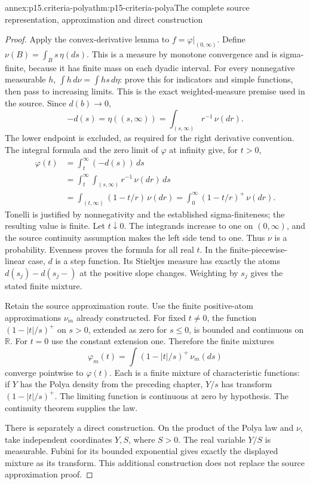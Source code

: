 \begin{annexitem}{annex:p15.criteria-polya}{thm:p15-criteria-polya}{The complete source representation, approximation and direct construction}
\begin{proof}
Apply the convex-derivative lemma to \(f=\varphi|_{(0,\infty)}\).
Define \(\nu(B)=\int_B s\,\eta(ds)\).
This is a measure by monotone convergence and is sigma-finite,
because it has finite mass on each dyadic interval.
For every nonnegative measurable \(h\),
\(\int h\,d\nu=\int hs\,d\eta\): prove this for indicators
and simple functions, then pass to increasing limits.
This is the exact weighted-measure premise used in the source.
Since \(d(b)\to0\),
\[
 -d(s)=\eta((s,\infty))
                =\int_{(s,\infty)}r^{-1}\,\nu(dr).
\]
The lower endpoint is excluded, as required for the right
derivative convention.
The integral formula and the zero limit of \(\varphi\) at
infinity give, for \(t>0\),
\[
 \begin{aligned}
 \varphi(t)
 &=\int_t^\infty(-d(s))\,ds\\
 &=\int_t^\infty\int_{(s,\infty)}r^{-1}\,\nu(dr)\,ds\\
 &=\int_{(t,\infty)}(1-t/r)\,\nu(dr)
  =\int_0^\infty(1-t/r)^+\,\nu(dr).
 \end{aligned}
\]
Tonelli is justified by nonnegativity and the established
sigma-finiteness; the resulting value is finite.
Let \(t\downarrow0\). The integrands increase to one
on \((0,\infty)\), and the source continuity assumption
makes the left side tend to one. Thus \(\nu\) is a
probability. Evenness proves the formula for all real \(t\).
In the finite-piecewise-linear case, \(d\) is a step
function. Its Stieltjes measure has exactly the atoms
\(d(s_j)-d(s_j-)\) at the positive slope changes.
Weighting by \(s_j\) gives the stated finite mixture.

Retain the source approximation route.
Use the finite positive-atom approximations \(\nu_m\)
already constructed. For fixed \(t\ne0\), the function
\((1-|t|/s)^+\) on \(s>0\), extended as zero for \(s\leq0\),
is bounded and continuous on \(\mathbb R\).
For \(t=0\) use the constant extension one.
Therefore the finite mixtures
\[
 \varphi_m(t)=\int(1-|t|/s)^+\,\nu_m(ds)
\]
converge pointwise to \(\varphi(t)\).
Each is a finite mixture of characteristic functions:
if \(Y\) has the Polya density from the preceding
chapter, \(Y/s\) has transform \((1-|t|/s)^+\).
The limiting function is continuous at zero by
hypothesis. The continuity theorem supplies the law.

There is separately a direct construction.
On the product of the Polya law and \(\nu\), take
independent coordinates \(Y,S\), where \(S>0\).
The real variable \(Y/S\) is measurable.
Fubini for its bounded exponential gives exactly the
displayed mixture as its transform. This additional
construction does not replace the source approximation proof.


\end{proof}
\end{annexitem}
